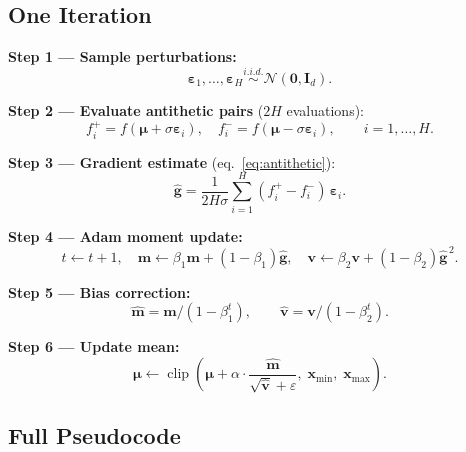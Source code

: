 \documentclass[12pt, a4paper]{article}
\newcommand{\bmu}{\boldsymbol{\mu}}
\newcommand{\beps}{\boldsymbol{\varepsilon}}
\newcommand{\bx}{\mathbf{x}}
\newcommand{\mvec}{\mathbf{m}}           %
\newcommand{\vvec}{\mathbf{v}}           %
\newcommand{\mhat}{\hat{\mathbf{m}}}     %
\newcommand{\vhat}{\hat{\mathbf{v}}}     %
\newcommand{\NN}{\mathcal{N}}
\DeclareMathOperator{\clip}{clip}
\begin{document}
\subsection{One Iteration}

\noindent\textbf{Step 1 — Sample perturbations:}
\begin{equation*}
  \beps_1,\ldots,\beps_H \overset{i.i.d.}{\sim} \NN(\mathbf{0},\mathbf{I}_d).
\end{equation*}

\noindent\textbf{Step 2 — Evaluate antithetic pairs} ($2H$ evaluations):
\begin{equation*}
  f^+_i = f(\bmu+\sigma\beps_i),\quad
  f^-_i = f(\bmu-\sigma\beps_i),\qquad i=1,\ldots,H.
\end{equation*}

\noindent\textbf{Step 3 — Gradient estimate} (eq.~\eqref{eq:antithetic}):
\begin{equation*}
  \hat{\mathbf{g}}
  = \frac{1}{2H\sigma}\sum_{i=1}^{H}(f^+_i-f^-_i)\,\beps_i.
\end{equation*}

\noindent\textbf{Step 4 — Adam moment update:}
\begin{equation*}
  t\leftarrow t+1,\quad
  \mvec\leftarrow\beta_1\mvec+(1-\beta_1)\hat{\mathbf{g}},\quad
  \vvec\leftarrow\beta_2\vvec+(1-\beta_2)\hat{\mathbf{g}}^{\,2}.
\end{equation*}

\noindent\textbf{Step 5 — Bias correction:}
\begin{equation*}
  \mhat = \mvec/(1-\beta_1^t),\qquad
  \vhat = \vvec/(1-\beta_2^t).
\end{equation*}

\noindent\textbf{Step 6 — Update mean:}
\begin{equation*}
  \bmu\leftarrow
  \clip\!\left(
    \bmu+\alpha\cdot\frac{\mhat}{\sqrt{\vhat}+\varepsilon},\;
    \bx_{\min},\;\bx_{\max}
  \right).
\end{equation*}

\subsection{Full Pseudocode}
\end{document}
